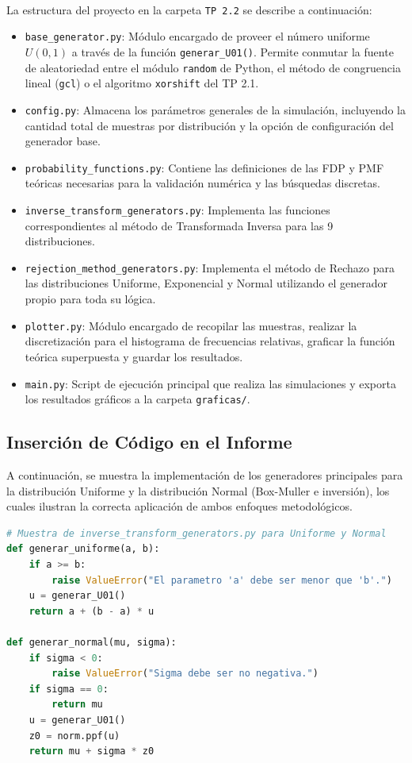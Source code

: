 \documentclass{article}
\begin{document}
\paragraph{}
La estructura del proyecto en la carpeta \texttt{TP 2.2} se describe a continuación:
\begin{itemize}
    \item \texttt{base\_generator.py}: Módulo encargado de proveer el número uniforme $U(0,1)$ a través de la función \texttt{generar\_U01()}. Permite conmutar la fuente de aleatoriedad entre el módulo \texttt{random} de Python, el método de congruencia lineal (\texttt{gcl}) o el algoritmo \texttt{xorshift} del TP 2.1.
    \item \texttt{config.py}: Almacena los parámetros generales de la simulación, incluyendo la cantidad total de muestras por distribución y la opción de configuración del generador base.
    \item \texttt{probability\_functions.py}: Contiene las definiciones de las FDP y PMF teóricas necesarias para la validación numérica y las búsquedas discretas.
    \item \texttt{inverse\_transform\_generators.py}: Implementa las funciones correspondientes al método de Transformada Inversa para las 9 distribuciones.
    \item \texttt{rejection\_method\_generators.py}: Implementa el método de Rechazo para las distribuciones Uniforme, Exponencial y Normal utilizando el generador propio para toda su lógica.
    \item \texttt{plotter.py}: Módulo encargado de recopilar las muestras, realizar la discretización para el histograma de frecuencias relativas, graficar la función teórica superpuesta y guardar los resultados.
    \item \texttt{main.py}: Script de ejecución principal que realiza las simulaciones y exporta los resultados gráficos a la carpeta \texttt{graficas/}.
\end{itemize}

\subsection{Inserción de Código en el Informe}
A continuación, se muestra la implementación de los generadores principales para la distribución Uniforme y la distribución Normal (Box-Muller e inversión), los cuales ilustran la correcta aplicación de ambos enfoques metodológicos.

\begin{lstlisting}[language=Python, caption=Implementación de los generadores por Transformada Inversa]
# Muestra de inverse_transform_generators.py para Uniforme y Normal
def generar_uniforme(a, b):
    if a >= b:
        raise ValueError("El parametro 'a' debe ser menor que 'b'.")
    u = generar_U01()
    return a + (b - a) * u

def generar_normal(mu, sigma):
    if sigma < 0:
        raise ValueError("Sigma debe ser no negativa.")
    if sigma == 0:
        return mu
    u = generar_U01()
    z0 = norm.ppf(u)
    return mu + sigma * z0
\end{lstlisting}
\end{document}
